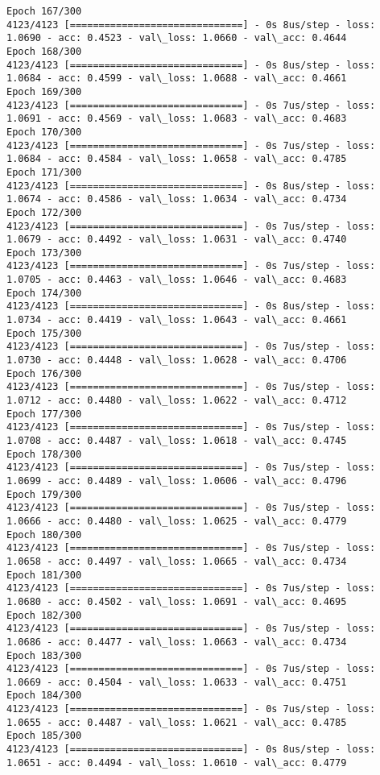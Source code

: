 \documentclass[11pt]{article}
\begin{document}
\begin{Verbatim}[commandchars=\\\{\}]
Epoch 167/300
4123/4123 [==============================] - 0s 8us/step - loss: 1.0690 - acc: 0.4523 - val\_loss: 1.0660 - val\_acc: 0.4644
Epoch 168/300
4123/4123 [==============================] - 0s 8us/step - loss: 1.0684 - acc: 0.4599 - val\_loss: 1.0688 - val\_acc: 0.4661
Epoch 169/300
4123/4123 [==============================] - 0s 7us/step - loss: 1.0691 - acc: 0.4569 - val\_loss: 1.0683 - val\_acc: 0.4683
Epoch 170/300
4123/4123 [==============================] - 0s 7us/step - loss: 1.0684 - acc: 0.4584 - val\_loss: 1.0658 - val\_acc: 0.4785
Epoch 171/300
4123/4123 [==============================] - 0s 8us/step - loss: 1.0674 - acc: 0.4586 - val\_loss: 1.0634 - val\_acc: 0.4734
Epoch 172/300
4123/4123 [==============================] - 0s 7us/step - loss: 1.0679 - acc: 0.4492 - val\_loss: 1.0631 - val\_acc: 0.4740
Epoch 173/300
4123/4123 [==============================] - 0s 7us/step - loss: 1.0705 - acc: 0.4463 - val\_loss: 1.0646 - val\_acc: 0.4683
Epoch 174/300
4123/4123 [==============================] - 0s 8us/step - loss: 1.0734 - acc: 0.4419 - val\_loss: 1.0643 - val\_acc: 0.4661
Epoch 175/300
4123/4123 [==============================] - 0s 7us/step - loss: 1.0730 - acc: 0.4448 - val\_loss: 1.0628 - val\_acc: 0.4706
Epoch 176/300
4123/4123 [==============================] - 0s 7us/step - loss: 1.0712 - acc: 0.4480 - val\_loss: 1.0622 - val\_acc: 0.4712
Epoch 177/300
4123/4123 [==============================] - 0s 7us/step - loss: 1.0708 - acc: 0.4487 - val\_loss: 1.0618 - val\_acc: 0.4745
Epoch 178/300
4123/4123 [==============================] - 0s 7us/step - loss: 1.0699 - acc: 0.4489 - val\_loss: 1.0606 - val\_acc: 0.4796
Epoch 179/300
4123/4123 [==============================] - 0s 7us/step - loss: 1.0666 - acc: 0.4480 - val\_loss: 1.0625 - val\_acc: 0.4779
Epoch 180/300
4123/4123 [==============================] - 0s 7us/step - loss: 1.0658 - acc: 0.4497 - val\_loss: 1.0665 - val\_acc: 0.4734
Epoch 181/300
4123/4123 [==============================] - 0s 7us/step - loss: 1.0680 - acc: 0.4502 - val\_loss: 1.0691 - val\_acc: 0.4695
Epoch 182/300
4123/4123 [==============================] - 0s 7us/step - loss: 1.0686 - acc: 0.4477 - val\_loss: 1.0663 - val\_acc: 0.4734
Epoch 183/300
4123/4123 [==============================] - 0s 7us/step - loss: 1.0669 - acc: 0.4504 - val\_loss: 1.0633 - val\_acc: 0.4751
Epoch 184/300
4123/4123 [==============================] - 0s 7us/step - loss: 1.0655 - acc: 0.4487 - val\_loss: 1.0621 - val\_acc: 0.4785
Epoch 185/300
4123/4123 [==============================] - 0s 8us/step - loss: 1.0651 - acc: 0.4494 - val\_loss: 1.0610 - val\_acc: 0.4779

\end{Verbatim}
\end{document}
